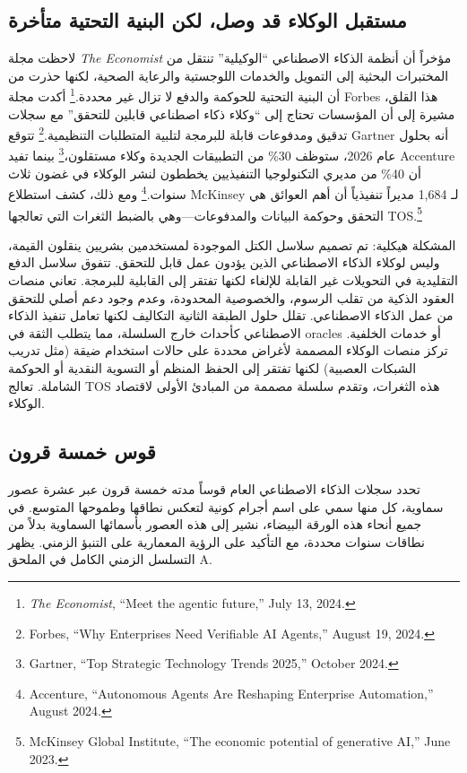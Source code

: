 \documentclass[11pt]{article}
\begin{document}
\subsection{مستقبل الوكلاء قد وصل، لكن البنية التحتية متأخرة}
لاحظت مجلة \emph{The Economist} مؤخراً أن أنظمة الذكاء الاصطناعي ``الوكيلية'' تنتقل من المختبرات البحثية إلى التمويل والخدمات اللوجستية والرعاية الصحية، لكنها حذرت من أن البنية التحتية للحوكمة والدفع لا تزال غير محددة.\footnote{\emph{The Economist}, ``Meet the agentic future,'' July 13, 2024.} أكدت مجلة Forbes هذا القلق، مشيرة إلى أن المؤسسات تحتاج إلى ``وكلاء ذكاء اصطناعي قابلين للتحقق'' مع سجلات تدقيق ومدفوعات قابلة للبرمجة لتلبية المتطلبات التنظيمية.\footnote{Forbes, ``Why Enterprises Need Verifiable AI Agents,'' August 19, 2024.} تتوقع Gartner أنه بحلول عام 2026، ستوظف 30\% من التطبيقات الجديدة وكلاء مستقلون،\footnote{Gartner, ``Top Strategic Technology Trends 2025,'' October 2024.} بينما تفيد Accenture أن 40\% من مديري التكنولوجيا التنفيذيين يخططون لنشر الوكلاء في غضون ثلاث سنوات.\footnote{Accenture, ``Autonomous Agents Are Reshaping Enterprise Automation,'' August 2024.} ومع ذلك، كشف استطلاع McKinsey لـ 1,684 مديراً تنفيذياً أن أهم العوائق هي التحقق وحوكمة البيانات والمدفوعات---وهي بالضبط الثغرات التي تعالجها TOS.\footnote{McKinsey Global Institute, ``The economic potential of generative AI,'' June 2023.}

المشكلة هيكلية: تم تصميم سلاسل الكتل الموجودة لمستخدمين بشريين ينقلون القيمة، وليس لوكلاء الذكاء الاصطناعي الذين يؤدون عمل قابل للتحقق. تتفوق سلاسل الدفع التقليدية في التحويلات غير القابلة للإلغاء لكنها تفتقر إلى القابلية للبرمجة. تعاني منصات العقود الذكية من تقلب الرسوم، والخصوصية المحدودة، وعدم وجود دعم أصلي للتحقق من عمل الذكاء الاصطناعي. تقلل حلول الطبقة الثانية التكاليف لكنها تعامل تنفيذ الذكاء الاصطناعي كأحداث خارج السلسلة، مما يتطلب الثقة في oracles أو خدمات الخلفية. تركز منصات الوكلاء المصممة لأغراض محددة على حالات استخدام ضيقة (مثل تدريب الشبكات العصبية) لكنها تفتقر إلى الحفظ المنظم أو التسوية النقدية أو الحوكمة الشاملة. تعالج TOS هذه الثغرات، وتقدم سلسلة مصممة من المبادئ الأولى لاقتصاد الوكلاء.

\subsection{قوس خمسة قرون}
تحدد سجلات الذكاء الاصطناعي العام قوساً مدته خمسة قرون عبر عشرة عصور سماوية، كل منها سمي على اسم أجرام كونية لتعكس نطاقها وطموحها المتوسع. في جميع أنحاء هذه الورقة البيضاء، نشير إلى هذه العصور بأسمائها السماوية بدلاً من نطاقات سنوات محددة، مع التأكيد على الرؤية المعمارية على التنبؤ الزمني. يظهر التسلسل الزمني الكامل في الملحق A.
\end{document}
